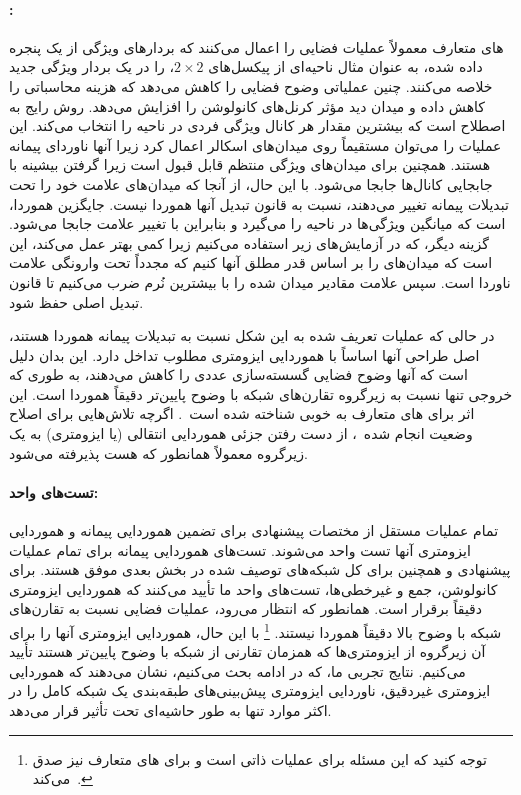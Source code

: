 \paragraph{:}
های متعارف معمولاً عملیات  فضایی را اعمال می‌کنند که بردارهای ویژگی از یک پنجره  داده شده، به عنوان مثال ناحیه‌ای از پیکسل‌های $2\times2$، را در یک بردار ویژگی جدید خلاصه می‌کنند.
چنین عملیاتی وضوح فضایی را کاهش می‌دهد که هزینه محاسباتی را کاهش داده و میدان دید مؤثر کرنل‌های کانولوشن را افزایش می‌دهد.
روش رایج  به اصطلاح  است که بیشترین مقدار هر کانال ویژگی فردی در ناحیه  را انتخاب می‌کند.
این عملیات را می‌توان مستقیماً روی میدان‌های اسکالر اعمال کرد زیرا آنها ناوردای پیمانه هستند.
همچنین برای میدان‌های ویژگی منتظم قابل قبول است زیرا گرفتن بیشینه با جابجایی کانال‌ها جابجا می‌شود.
با این حال، از آنجا که میدان‌های  علامت خود را تحت تبدیلات پیمانه تغییر می‌دهند،  نسبت به قانون تبدیل آنها هموردا نیست.
جایگزین هموردا،  است که میانگین ویژگی‌ها در ناحیه  را می‌گیرد و بنابراین با تغییر علامت جابجا می‌شود.
گزینه دیگر، که در آزمایش‌های زیر استفاده می‌کنیم زیرا کمی بهتر عمل می‌کند، این است که میدان‌های  را بر اساس قدر مطلق آنها  کنیم که مجدداً تحت وارونگی علامت ناوردا است.
سپس علامت مقادیر میدان  شده را با بیشترین نُرم ضرب می‌کنیم تا قانون تبدیل اصلی حفظ شود.

در حالی که عملیات  تعریف شده به این شکل نسبت به تبدیلات پیمانه هموردا هستند، اصل طراحی آنها اساساً با هموردایی ایزومتری مطلوب تداخل دارد.
این بدان دلیل است که آنها وضوح فضایی گسسته‌سازی عددی را کاهش می‌دهند، به طوری که خروجی تنها نسبت به زیرگروه تقارن‌های شبکه با وضوح پایین‌تر دقیقاً هموردا است.
این اثر برای های متعارف به خوبی شناخته شده است~\cite{azulay2018shift}.
اگرچه تلاش‌هایی برای اصلاح وضعیت انجام شده~\cite{zhang2019CNNsShiftInvariant}، از دست رفتن جزئی هموردایی انتقالی (یا ایزومتری) به یک زیرگروه معمولاً همانطور که هست پذیرفته می‌شود.

\paragraph{تست‌های واحد:}
تمام عملیات مستقل از مختصات پیشنهادی برای تضمین هموردایی پیمانه و هموردایی ایزومتری آنها تست واحد می‌شوند.
تست‌های هموردایی پیمانه برای تمام عملیات پیشنهادی و همچنین برای کل شبکه‌های توصیف شده در بخش بعدی موفق هستند.
برای کانولوشن، جمع  و غیرخطی‌ها، تست‌های واحد ما تأیید می‌کنند که هموردایی ایزومتری دقیقاً برقرار است.
همانطور که انتظار می‌رود، عملیات  فضایی نسبت به تقارن‌های شبکه با وضوح بالا دقیقاً هموردا نیستند.%
\footnote{
	توجه کنید که این مسئله برای عملیات  ذاتی است و برای های متعارف نیز صدق می‌کند~\cite{azulay2018shift,zhang2019CNNsShiftInvariant}.
}
با این حال، هموردایی ایزومتری آنها را برای آن زیرگروه از ایزومتری‌ها که همزمان تقارنی از شبکه با وضوح پایین‌تر هستند تأیید می‌کنیم.
نتایج تجربی ما، که در ادامه بحث می‌کنیم، نشان می‌دهند که هموردایی ایزومتری غیردقیق، ناوردایی ایزومتری پیش‌بینی‌های طبقه‌بندی یک شبکه کامل را در اکثر موارد تنها به طور حاشیه‌ای تحت تأثیر قرار می‌دهد.

